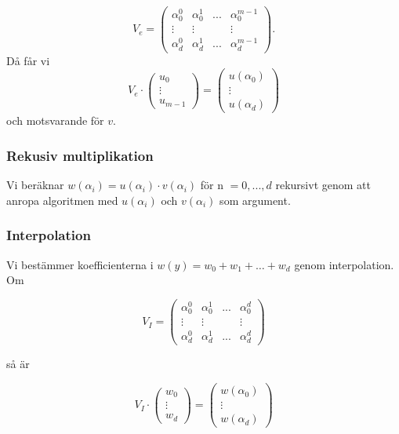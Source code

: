 \begin{equation}
\label{eq:NAME}
V_e =
\begin{pmatrix}
  \alpha_0^0 & \alpha_0^1 & ... & \alpha_0^{m-1}\\
  \vdots & \vdots & & \vdots \\
  \alpha_d^0 & \alpha_d^1 & ... & \alpha_d^{m-1}
\end{pmatrix}.
\end{equation}
Då får vi
\begin{equation}
\label{eq:NAME2}
V_e \cdot
\begin{pmatrix}
  u_0\\
  \vdots \\
  u_{m-1}
\end{pmatrix}
 =
\begin{pmatrix}
 u(\alpha_0)\\
 \vdots \\
 u(\alpha_d)
\end{pmatrix}
\end{equation}
och motsvarande för $v$.

\subsubsection{Rekusiv multiplikation}
Vi beräknar $w(\alpha_i)=u(\alpha_i) \cdot v(\alpha_i)$ för n $= 0, ... , d$ rekursivt genom att anropa algoritmen
med $u(\alpha_i)$ och $v(\alpha_i)$ som argument.

\subsubsection{Interpolation}
Vi bestämmer koefficienterna i $w(y)=w_0 + w_1 + \ldots + w_d$ genom interpolation. Om

\begin{equation}
\label{eq:NAME3}
V_I =
\begin{pmatrix}
  \alpha_0^0 & \alpha_0^1 & ... & \alpha_0^d\\
  \vdots & \vdots & & \vdots \\
  \alpha_d^0 & \alpha_d^1 & ... & \alpha_d^d
\end{pmatrix}
\end{equation}

så är

\begin{equation}
\label{eq:NAME4}
V_I \cdot
\begin{pmatrix}
  w_0\\
  \vdots\\
  w_d
\end{pmatrix}
=
\begin{pmatrix}
  w(\alpha_0)\\
  \vdots\\
  w(\alpha_d)
\end{pmatrix}
\end{equation}

